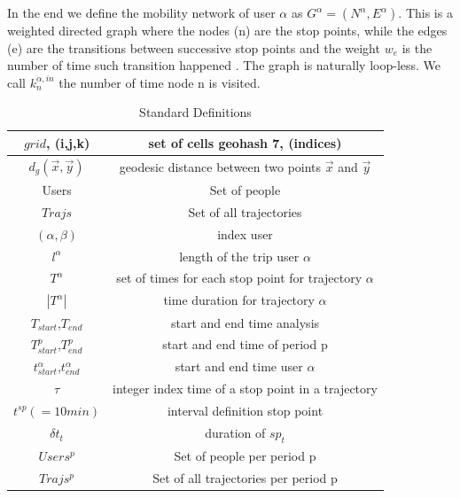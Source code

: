 \documentclass[main.tex]{subfiles}
\begin{document}
In the end we define the mobility network of user $\alpha$ as $G^{\alpha} = (N^{\alpha},E^{\alpha})$.
This is a weighted directed graph where the nodes (n) are the stop points, while the edges (e) are the transitions between successive stop points and the weight $w_{e}$ is the number of time such transition happened . The graph is naturally loop-less. We call $k^{\alpha,in}_n$ the number of time node n is visited.
%
\begin{table}[h!]
    \centering
    \begin{tabular}{|c|c|}
        \hline
        $grid$, (i,j,k) &  set of cells geohash 7, (indices) \\
        \hline
        $d_{g}(\Vec{x},\Vec{y})$ &  geodesic distance between two points $\Vec{x}$ and $\Vec{y}$\\
        \hline
        Users & Set of people \\
        \hline
        $Trajs$ &  Set of all trajectories \\
        \hline
        $(\alpha,\beta)$ & index user \\
        \hline
        $l^{\alpha}$ & length of the trip user $\alpha$ \\
        \hline
        $T^{\alpha}$ & set of times for each stop point for trajectory $\alpha$\\
        \hline
        $|T^{\alpha}|$ & time duration for trajectory $\alpha$\\
        \hline

        $T_{start}$,$T_{end}$ & start and end time analysis \\
        \hline
        $T^{p}_{start}$,$T^{p}_{end}$ & start and end time of period p \\
        \hline
        $t_{start}^{\alpha}$,$t_{end}^{\alpha}$ & start and end time user $\alpha$ \\
        \hline
        $\tau$ & integer index time of a stop point in a trajectory \\
        \hline
        $t^{sp} (=10 min)$ & interval definition stop point\\
        \hline
        $\delta t_{t}$ & duration of $sp_{t}$\\
        \hline
        $Users^{p}$ & Set of people per period p \\
        \hline
        $Trajs^{p}$ &  Set of all trajectories per period p \\
        \hline
    \end{tabular}
    \caption{Standard Definitions}
    \label{tab:standard_definitions}
\end{table}
%
\end{document}
